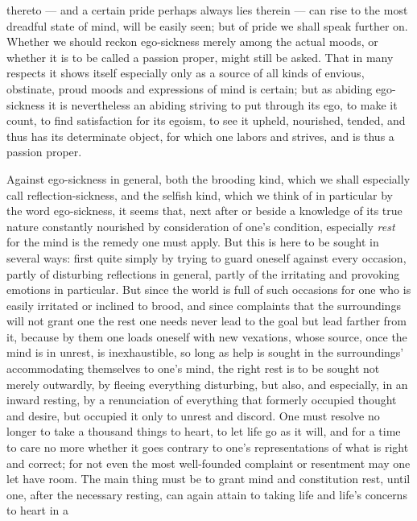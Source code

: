 \documentclass[12pt,a4paper,openany]{book}
\newcommand{\opage}[1]{\marginnote{\footnotesize\textit{[#1]}}}
\begin{document}
thereto --- and a certain pride perhaps always lies therein --- can rise to the most
dreadful state of mind, will be easily seen; but of pride we shall speak further on.
Whether we should reckon ego-sickness merely among the actual moods, or whether it
is to be called a passion proper, might still be asked. That in many respects it
shows itself especially only as a source of all kinds of envious, obstinate, proud
moods and expressions of mind is certain; but as abiding ego-sickness it is
nevertheless an abiding striving to put through its ego, to make it count, to find
satisfaction for its egoism, to see it upheld, nourished, tended, and thus has its
determinate object, for which one labors and strives, and is thus a passion proper.

Against ego-sickness in general, both the brooding kind, which we shall especially
call reflection-sickness, and the selfish kind, which we think of in particular by
the word ego-sickness, it seems that, next after or beside a knowledge of its true
nature constantly nourished by consideration of one's condition, especially
\emph{rest} for the mind is the remedy one must apply. But this is here to be sought
in several ways: first quite simply by trying to guard oneself against every
occasion, partly of disturbing reflections in general, partly of the irritating and
provoking emotions in particular. But since the world is full of such occasions for
one who is easily irritated or inclined to brood, and since complaints that the
surroundings will not grant one the rest one needs never lead to the goal but lead
farther from it, because by them one loads oneself with new vexations, whose source,
once the mind is in unrest, is inexhaustible, so long as help is sought in the
surroundings' accommodating themselves to one's mind, the right rest is to be
sought not merely outwardly, by fleeing everything disturbing, but also, and
especially, in an
\setcounter{footnote}{0}%
\opage{121}inward resting, by a renunciation of everything that formerly occupied thought and
desire, but occupied it only to unrest and discord. One must resolve no longer to
take a thousand things to heart, to let life go as it will, and for a time to care no
more whether it goes contrary to one's representations of what is right and correct;
for not even the most well-founded complaint or resentment may one let have room. The
main thing must be to grant mind and constitution rest, until one, after the
necessary resting, can again attain to taking life and life's concerns to heart in a
\end{document}
